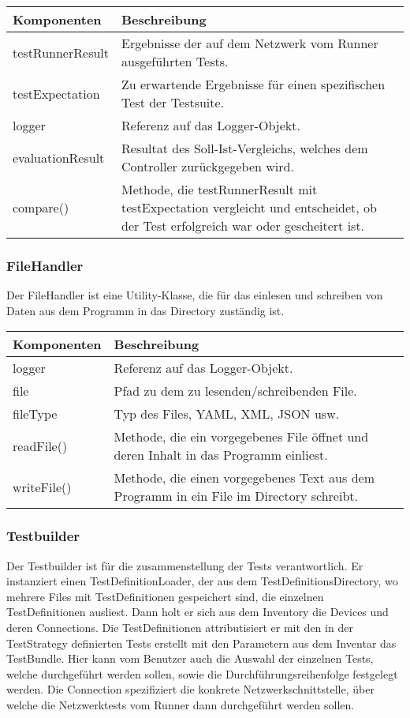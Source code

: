 \documentclass[
	ngerman,
	toc=listof, %
	toc=bibliography, %
	footnotes=multiple, %
	parskip=half, %
	numbers=noendperiod %
]{scrartcl}
\begin{document}
	\begin{tabularx}{\textwidth}{lX}
		\toprule
			Komponenten & Beschreibung \\
		\midrule
			testRunnerResult & Ergebnisse der auf dem Netzwerk vom Runner ausgeführten Tests. \\
			testExpectation & Zu erwartende Ergebnisse für einen spezifischen Test der Testsuite. \\
			logger & Referenz auf das Logger-Objekt. \\
			evaluationResult & Resultat des Soll-Ist-Vergleichs, welches dem Controller zurückgegeben wird.\\
		\midrule
			compare() & Methode, die testRunnerResult mit testExpectation vergleicht und entscheidet, ob der Test erfolgreich war oder gescheitert ist. \\
		\bottomrule
	\end{tabularx}
	\newpage

	\subsubsection{FileHandler}
	Der FileHandler ist eine Utility-Klasse, die für das einlesen und schreiben von Daten aus dem Programm in das Directory zuständig ist.
	
	\begin{tabularx}{\textwidth}{lX}
		\toprule
			Komponenten & Beschreibung \\
		\midrule
			logger & Referenz auf das Logger-Objekt. \\
			file & Pfad zu dem zu lesenden/schreibenden File. \\
			fileType & Typ des Files, YAML, XML, JSON usw. \\
		\midrule
			readFile() & Methode, die ein vorgegebenes File öffnet und deren Inhalt in das Programm einliest. \\
			writeFile() & Methode, die einen vorgegebenes Text aus dem Programm in ein File im Directory schreibt. \\
		\bottomrule
	\end{tabularx}

	\subsubsection{Testbuilder}
	Der Testbuilder ist für die zusammenstellung der Tests verantwortlich. 
	Er instanziert einen TestDefinitionLoader, der aus dem TestDefinitionsDirectory, wo mehrere Files mit TestDefinitionen gespeichert sind, die einzelnen TestDefinitionen ausliest.
	Dann holt er sich aus dem Inventory die Devices und deren Connections. 
	Die TestDefinitionen attributisiert er mit den in der TestStrategy definierten Tests erstellt mit den Parametern aus dem Inventar das TestBundle. 
	Hier kann vom Benutzer auch die Auswahl der einzelnen Tests, welche durchgeführt werden sollen, sowie die Durchführungsreihenfolge festgelegt werden.
	Die Connection spezifiziert die konkrete Netzwerkschnittstelle, über welche die Netzwerktests vom Runner dann durchgeführt werden sollen.
\end{document}
